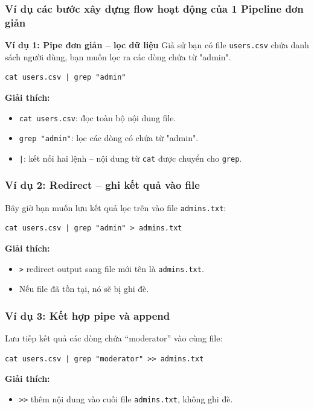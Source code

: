 \documentclass[11pt]{article}
\begin{document}
\subsubsection{Ví dụ các bước xây dựng flow hoạt động của 1 Pipeline đơn giản}
\textbf{Ví dụ 1: Pipe đơn giản – lọc dữ liệu}
Giả sử bạn có file \texttt{users.csv} chứa danh sách người dùng, bạn muốn lọc ra các dòng chứa từ "admin".
\begin{verbatim}
cat users.csv | grep "admin"
\end{verbatim}

\textbf{Giải thích:}
\begin{itemize}
	\item \texttt{cat users.csv}: đọc toàn bộ nội dung file.
	\item \texttt{grep "admin"}: lọc các dòng có chứa từ "admin".
	\item \texttt{|}: kết nối hai lệnh – nội dung từ \texttt{cat} được chuyển cho \texttt{grep}.
\end{itemize}

\subsubsection*{Ví dụ 2: Redirect – ghi kết quả vào file}

Bây giờ bạn muốn lưu kết quả lọc trên vào file \texttt{admins.txt}:

\begin{verbatim}
cat users.csv | grep "admin" > admins.txt
\end{verbatim}

\textbf{Giải thích:}
\begin{itemize}
	\item \texttt{>} redirect output sang file mới tên là \texttt{admins.txt}.
	\item Nếu file đã tồn tại, nó sẽ bị ghi đè.
\end{itemize}

\subsubsection*{Ví dụ 3: Kết hợp pipe và append}

Lưu tiếp kết quả các dòng chứa “moderator” vào cùng file:

\begin{verbatim}
cat users.csv | grep "moderator" >> admins.txt
\end{verbatim}

\textbf{Giải thích:}
\begin{itemize}
	\item \texttt{>>} thêm nội dung vào cuối file \texttt{admins.txt}, không ghi đè.
\end{itemize}
\end{document}
